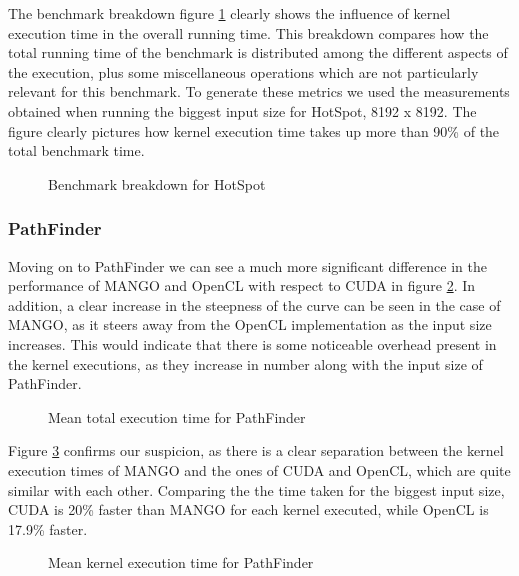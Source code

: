 The benchmark breakdown figure \ref{fig:hotspot_breakdown} clearly shows the influence of kernel execution time in the overall running time. This breakdown compares how the total running time of the benchmark is distributed among the different aspects of the execution, plus some miscellaneous operations which are not particularly relevant for this benchmark. To generate these metrics we used the measurements obtained when running the biggest input size for HotSpot, 8192 x 8192. The figure clearly pictures how kernel execution time takes up more than 90\% of the total benchmark time.

\begin{figure}
    \centering
    \resizebox{!}{160pt}{
        
    }
    \captionsetup{justification=centering}
    \caption{Benchmark breakdown for HotSpot}
    \label{fig:hotspot_breakdown}
\end{figure}

\subsubsection{PathFinder}

Moving on to PathFinder we can see a much more significant difference in the performance of MANGO and OpenCL with respect to CUDA in figure \ref{fig:pathfinder_total_duration_mean}. In addition, a clear increase in the steepness of the curve can be seen in the case of MANGO, as it steers away from the OpenCL implementation as the input size increases. This would indicate that there is some noticeable overhead present in the kernel executions, as they increase in number along with the input size of PathFinder.

\begin{figure}
    \centering
    \resizebox{!}{160pt}{
        
    }
    \captionsetup{justification=centering}
    \caption{Mean total execution time for PathFinder}
    \label{fig:pathfinder_total_duration_mean}
\end{figure}

Figure \ref{fig:pathfinder_kernel_executions_mean} confirms our suspicion, as there is a clear separation between the kernel execution times of MANGO and the ones of CUDA and OpenCL, which are quite similar with each other. Comparing the the time taken for the biggest input size, CUDA is 20\% faster than MANGO for each kernel executed, while OpenCL is 17.9\% faster.

\begin{figure}
    \centering
    \resizebox{!}{160pt}{
        
    }
    \captionsetup{justification=centering}
    \caption{Mean kernel execution time for PathFinder}
    \label{fig:pathfinder_kernel_executions_mean}
\end{figure}

